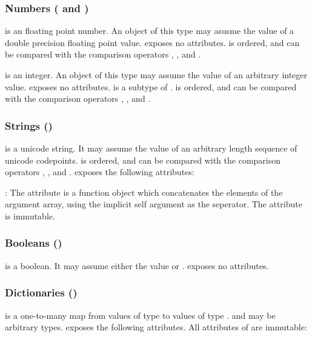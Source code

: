 \subsubsection{Numbers ( and )}

 is an floating point number. An object of this type may asusme the
value of a double precision floating point value.  exposes no
attributes.  is ordered, and can be compared with the comparison
operators \code{<}, \code{>}, \code{<=} and \code{>=}.

 is an integer. An object of this type may assume the value of an
arbitrary integer value.  exposes no attributes.  is a
subtype of .  is ordered, and can be compared with the
comparison operators \code{<}, \code{>}, \code{<=} and \code{>=}.


\subsubsection{Strings ()}

 is a unicode string. It may assume the value of an arbitrary length
sequence of unicode codepoints.  is ordered, and can be compared with
the comparison operators \code{<}, \code{>}, \code{<=} and \code{>=}. 
exposes the following attributes:

: The  attribute is a function object which
concatenates the elements of the argument array, using the implicit self
argument as the seperator. The  attribute is immutable.

\subsubsection{Booleans ()}

 is a boolean. It may assume either the value  or
.  exposes no attributes.

\subsubsection{Dictionaries ()}

 is a one-to-many map from values of type  to values of
type .  and  may be arbitrary types. 
exposes the following attributes. All attributes of  are
immutable:

